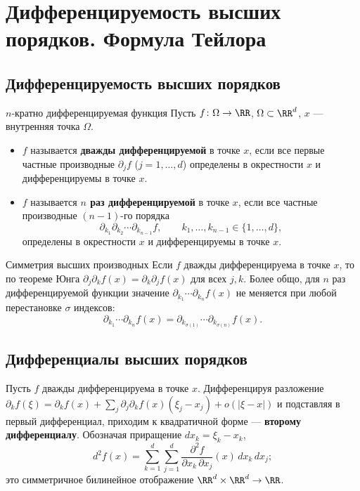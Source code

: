 
\section{Дифференцируемость высших порядков. Формула Тейлора}

\subsection*{Дифференцируемость высших порядков}

\begin{Definition}{$n$-кратно дифференцируемая функция}{}
	Пусть $f\colon\Omega\to\RR$, $\Omega\subset\RR^d$, $x$ --- внутренняя точка $\Omega$.
	\begin{itemize}
		\item $f$ называется \textbf{дважды дифференцируемой} в точке $x$, если все
		первые частные производные $\partial_j f$ ($j=1,\dots,d$) определены в
		окрестности $x$ и дифференцируемы в точке $x$.
		\item $f$ называется \textbf{$n$ раз дифференцируемой} в точке $x$, если все
		частные производные $(n-1)$-го порядка
		\[
		\partial_{k_1}\partial_{k_2}\cdots\partial_{k_{n-1}} f,
		\qquad k_1,\dots,k_{n-1}\in\{1,\dots,d\},
		\]
		определены в окрестности $x$ и дифференцируемы в точке $x$.
	\end{itemize}
\end{Definition}

\begin{Remark}{Симметрия высших производных}{}
	Если $f$ дважды дифференцируема в точке $x$, то по теореме Юнга
	$\partial_j\partial_k f(x)=\partial_k\partial_j f(x)$ для всех $j,k$. Более общо,
	для $n$ раз дифференцируемой функции значение
	$\partial_{k_1}\cdots\partial_{k_n} f(x)$ не меняется при любой перестановке
	$\sigma$ индексов:
	\[
	\partial_{k_1}\cdots\partial_{k_n} f(x)
	=\partial_{k_{\sigma(1)}}\cdots\partial_{k_{\sigma(n)}} f(x).
	\]
\end{Remark}

\subsection*{Дифференциалы высших порядков}

Пусть $f$ дважды дифференцируема в точке $x$. Дифференцируя разложение
$\partial_k f(\xi)=\partial_k f(x)+\sum_{j}\partial_j\partial_k f(x)(\xi_j-x_j)+o(|\xi-x|)$
и подставляя в первый дифференциал, приходим к квадратичной форме --- \textbf{второму
дифференциалу}. Обозначая приращение $dx_k=\xi_k-x_k$,
\[
d^2 f(x)=\sum_{k=1}^d\sum_{j=1}^d\frac{\partial^2 f}{\partial x_k\,\partial x_j}(x)\,dx_k\,dx_j;
\]
это симметричное билинейное отображение $\RR^d\times\RR^d\to\RR$.

